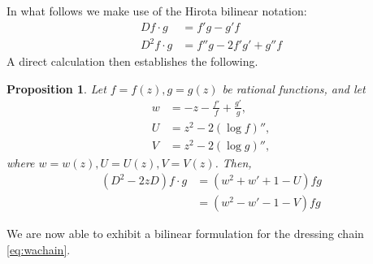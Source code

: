 \documentclass{amsart}
\newtheorem{proposition}{Proposition}
\theoremstyle{definition}
\begin{document}
In what follows we make use of the Hirota bilinear notation:
\begin{align}
  D f \cdot g &=  f' g - g'f \\
  D^2 f\cdot g &= f'' g -  2 f' g' + g'' f
\end{align}
A direct calculation then establishes the following.
\begin{proposition}
  \label{prop:tauwU}
  Let $f=f(z),g=g(z)$ be rational functions, and let
  \begin{align}
    \label{eq:wzfg}
     w &= -z- \frac{f'}{f} +
            \frac{g'}{g}, \\
    U &= z^2 - 2 (\log f)'',\\
    V &= z^2 - 2 (\log g)'',
  \end{align}
  where $w=w(z), U=U(z), V=V(z)$.
  Then,
  \begin{equation}
    \label{eq:taubilin}
  \begin{aligned}
    (D^2-2zD) f\cdot g
    &= (w^2 + w' +1-U)fg\\
    &= (w^2 - w' -1-V)fg
  \end{aligned}
  \end{equation}
\end{proposition}

We are now able to exhibit a bilinear formulation for the dressing
chain \eqref{eq:wachain}.
\end{document}
